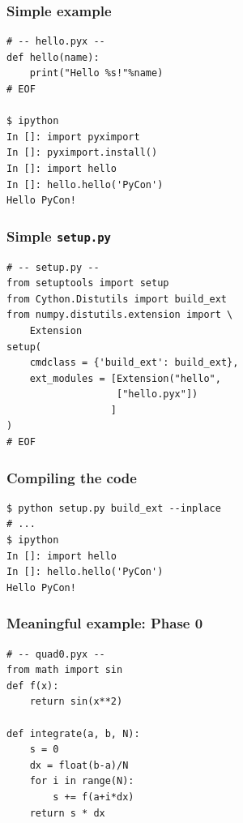 \documentclass[14pt,compress]{beamer}
\newcommand{\typ}[1]{\lstinline{#1}}
\begin{document}
\begin{frame}[fragile]
    \frametitle{Simple example}
\begin{lstlisting}
# -- hello.pyx --
def hello(name):
    print("Hello %s!"%name)
# EOF

$ ipython
In []: import pyximport
In []: pyximport.install()
In []: import hello
In []: hello.hello('PyCon')
Hello PyCon!
\end{lstlisting}

\end{frame}

\begin{frame}[fragile]
    \frametitle{Simple \typ{setup.py}}
\begin{lstlisting}
# -- setup.py --
from setuptools import setup
from Cython.Distutils import build_ext
from numpy.distutils.extension import \ 
    Extension
setup(
    cmdclass = {'build_ext': build_ext},
    ext_modules = [Extension("hello", 
                   ["hello.pyx"])
                  ]
)
# EOF
\end{lstlisting}

\end{frame}

\begin{frame}[fragile]
    \frametitle{Compiling the code}
\begin{lstlisting}
$ python setup.py build_ext --inplace
# ...
$ ipython
In []: import hello
In []: hello.hello('PyCon')
Hello PyCon!
\end{lstlisting}

\end{frame}

\begin{frame}[fragile]
    \frametitle{Meaningful example: Phase 0}
\begin{lstlisting}
# -- quad0.pyx --
from math import sin
def f(x):
    return sin(x**2)

def integrate(a, b, N):
    s = 0
    dx = float(b-a)/N
    for i in range(N):
        s += f(a+i*dx)
    return s * dx
\end{lstlisting}

\end{frame}
\end{document}
